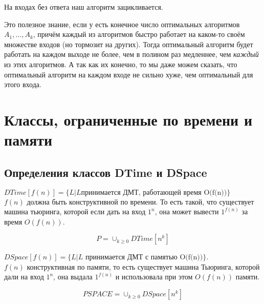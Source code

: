 	\begin{Rem}
		На входах без ответа наш алгоритм зацикливается.
	\end{Rem}
	\begin{Rem}
		Это полезное знание, если у есть конечное число оптимальных алгоритмов $A_1, \dots, A_k$, причём каждый из алгоритмов быстро работает на каком-то своём множестве входов (но тормозит на других).
		Тогда оптимальный алгоритм будет работать на каждом выходе не более, чем в полином раз медленнее, чем \textit{каждый} из этих алгоритмов.
		А так как их конечно, то мы даже можем сказать, что оптимальный алгоритм на каждом входе не сильно хуже, чем оптимальный для этого входа.
	\end{Rem}


\section{Классы, ограниченные по времени и памяти}
\subsection{Определения классов DTime и DSpace}
\begin{Def}
	$DTime[f(n)] = \{L| L\text{принимается ДМТ, работающей время O(f(n))}\}$\\
	$f(n)$ должна быть конструктивной по времени. То есть такой, что 
	существует машина тьюринга, которой если дать на вход $1^n$, она 
	может вывести $1^{f(n)}$ за время $O(f(n))$.
\end{Def}

\begin{Rem}
	$$P = \cup_{k \ge 0}DTime[n^k]$$
\end{Rem}

\begin{Def}
	$DSpace[f(n)] = \{L|L\text{ принимается ДМТ с памятью O(f(n))}\}$.\\
	$f(n)$ конструктивная по памяти, то есть существует машина Тьюринга, которой дали на вход $1^n$, 
	она выдала $1^{f(n)}$ и использовала при этом $O(f(n))$ памяти.
\end{Def}
\begin{Def}
	$$PSPACE = \cup_{k \ge 0}DSpace[n^k]$$
\end{Def}

